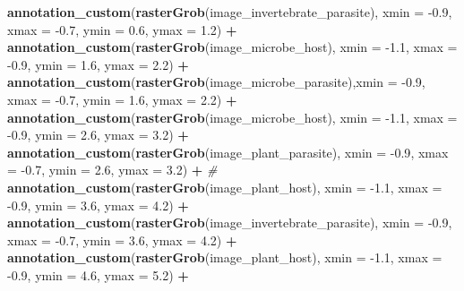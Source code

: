 \documentclass[
]{article}
\newenvironment{Shaded}{\begin{snugshade}}{\end{snugshade}}
\newcommand{\CommentTok}[1]{\textcolor[rgb]{0.56,0.35,0.01}{\textit{#1}}}
\newcommand{\DataTypeTok}[1]{\textcolor[rgb]{0.13,0.29,0.53}{#1}}
\newcommand{\FloatTok}[1]{\textcolor[rgb]{0.00,0.00,0.81}{#1}}
\newcommand{\KeywordTok}[1]{\textcolor[rgb]{0.13,0.29,0.53}{\textbf{#1}}}
\newcommand{\NormalTok}[1]{#1}
\newcommand{\OperatorTok}[1]{\textcolor[rgb]{0.81,0.36,0.00}{\textbf{#1}}}
\newcommand{\StringTok}[1]{\textcolor[rgb]{0.31,0.60,0.02}{#1}}
\begin{document}
\begin{Shaded}
\begin{Highlighting}[]
{{{{{\StringTok{  }\KeywordTok{annotation_custom}\NormalTok{(}\KeywordTok{rasterGrob}\NormalTok{(image_invertebrate_parasite), }\DataTypeTok{xmin =} \FloatTok{-0.9}\NormalTok{, }\DataTypeTok{xmax =} \FloatTok{-0.7}\NormalTok{, }\DataTypeTok{ymin =} \FloatTok{0.6}\NormalTok{, }\DataTypeTok{ymax =} \FloatTok{1.2}\NormalTok{) }\OperatorTok{+}\StringTok{ }
\StringTok{  }\KeywordTok{annotation_custom}\NormalTok{(}\KeywordTok{rasterGrob}\NormalTok{(image_microbe_host), }\DataTypeTok{xmin =} \FloatTok{-1.1}\NormalTok{, }\DataTypeTok{xmax =} \FloatTok{-0.9}\NormalTok{, }\DataTypeTok{ymin =} \FloatTok{1.6}\NormalTok{, }\DataTypeTok{ymax =} \FloatTok{2.2}\NormalTok{) }\OperatorTok{+}
\StringTok{  }\KeywordTok{annotation_custom}\NormalTok{(}\KeywordTok{rasterGrob}\NormalTok{(image_microbe_parasite),}\DataTypeTok{xmin =} \FloatTok{-0.9}\NormalTok{, }\DataTypeTok{xmax =} \FloatTok{-0.7}\NormalTok{, }\DataTypeTok{ymin =} \FloatTok{1.6}\NormalTok{, }\DataTypeTok{ymax =} \FloatTok{2.2}\NormalTok{) }\OperatorTok{+}
\StringTok{  }\KeywordTok{annotation_custom}\NormalTok{(}\KeywordTok{rasterGrob}\NormalTok{(image_microbe_host), }\DataTypeTok{xmin =} \FloatTok{-1.1}\NormalTok{, }\DataTypeTok{xmax =} \FloatTok{-0.9}\NormalTok{, }\DataTypeTok{ymin =} \FloatTok{2.6}\NormalTok{, }\DataTypeTok{ymax =} \FloatTok{3.2}\NormalTok{) }\OperatorTok{+}\StringTok{ }
\StringTok{  }\KeywordTok{annotation_custom}\NormalTok{(}\KeywordTok{rasterGrob}\NormalTok{(image_plant_parasite), }\DataTypeTok{xmin =} \FloatTok{-0.9}\NormalTok{, }\DataTypeTok{xmax =} \FloatTok{-0.7}\NormalTok{, }\DataTypeTok{ymin =} \FloatTok{2.6}\NormalTok{, }\DataTypeTok{ymax =} \FloatTok{3.2}\NormalTok{) }\OperatorTok{+}\StringTok{ }
\StringTok{  }\CommentTok{#}
\StringTok{  }\KeywordTok{annotation_custom}\NormalTok{(}\KeywordTok{rasterGrob}\NormalTok{(image_plant_host), }\DataTypeTok{xmin =} \FloatTok{-1.1}\NormalTok{, }\DataTypeTok{xmax =} \FloatTok{-0.9}\NormalTok{, }\DataTypeTok{ymin =} \FloatTok{3.6}\NormalTok{, }\DataTypeTok{ymax =} \FloatTok{4.2}\NormalTok{) }\OperatorTok{+}
\StringTok{  }\KeywordTok{annotation_custom}\NormalTok{(}\KeywordTok{rasterGrob}\NormalTok{(image_invertebrate_parasite), }\DataTypeTok{xmin =} \FloatTok{-0.9}\NormalTok{, }\DataTypeTok{xmax =} \FloatTok{-0.7}\NormalTok{, }\DataTypeTok{ymin =} \FloatTok{3.6}\NormalTok{, }\DataTypeTok{ymax =} \FloatTok{4.2}\NormalTok{) }\OperatorTok{+}
\StringTok{  }\KeywordTok{annotation_custom}\NormalTok{(}\KeywordTok{rasterGrob}\NormalTok{(image_plant_host), }\DataTypeTok{xmin =} \FloatTok{-1.1}\NormalTok{, }\DataTypeTok{xmax =} \FloatTok{-0.9}\NormalTok{, }\DataTypeTok{ymin =} \FloatTok{4.6}\NormalTok{, }\DataTypeTok{ymax =} \FloatTok{5.2}\NormalTok{) }\OperatorTok{+}
}}}}}
\end{Highlighting}
\end{Shaded}
\end{document}
